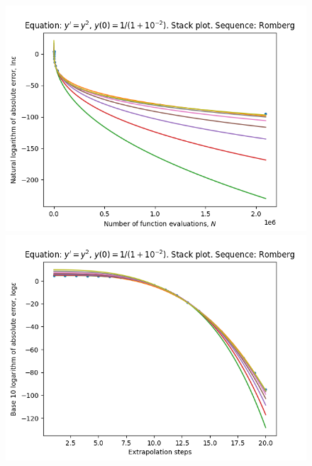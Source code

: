 \begin{figure}[H]
\centering
\begin{minipage}{0.45\textwidth}
\centering
\includegraphics[scale=0.45]{../results/emr_plots/singularity_2_hp_romberg_stack.png}
\end{minipage}
\begin{minipage}{0.45\textwidth}
\centering
\includegraphics[scale=0.45]{../results/emr_plots/singularity_2_hp_romberg_steps_stack.png}
\end{minipage}
\end{figure}

